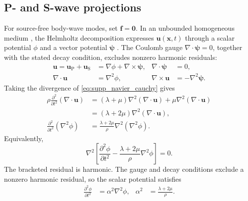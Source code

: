 \subsection*{P- and S-wave projections}

For source-free body-wave modes, set $\mathbf{f} = \mathbf{0}$. In an unbounded
homogeneous medium , the Helmholtz
decomposition expresses $\mathbf{u}(\mathbf{x},t)$ through a scalar potential
$\phi$ and a vector potential $\boldsymbol{\psi}$
\parencite{MorseFeshbach1953}.
The Coulomb gauge $\nabla \cdot \boldsymbol{\psi} = 0$, together with the
stated decay condition, excludes nonzero harmonic residuals:
\begin{equation*}
  \begin{aligned}
    \mathbf{u} = \mathbf{u}_\mathrm{P} + \mathbf{u}_\mathrm{S}
    & = \nabla\phi + \nabla \times \boldsymbol{\psi},
    &\nabla \cdot \boldsymbol{\psi}& = 0, \\
    \nabla \cdot \mathbf{u}& = \nabla^2\phi,
    &\nabla \times \mathbf{u}& = -\nabla^2\boldsymbol{\psi}.
  \end{aligned}
\end{equation*}
Taking the divergence of \cref{eq:supp_navier_cauchy} gives
\begin{equation*}
  \begin{aligned}
    \rho\frac{\partial^2}{\partial t^2}(\nabla \cdot \mathbf{u})
    & = (\lambda + \mu)\nabla^2(\nabla \cdot \mathbf{u})
    +\mu\nabla^2(\nabla \cdot \mathbf{u}) \\
    & = (\lambda + 2\mu)\nabla^2(\nabla \cdot \mathbf{u}), \\
    \frac{\partial^2}{\partial t^2}(\nabla^2\phi)
    & = \frac{\lambda + 2\mu}{\rho}\nabla^2(\nabla^2\phi).
  \end{aligned}
\end{equation*}
Equivalently,
\begin{equation*}
  \nabla^2\left[
    \frac{\partial^2\phi}{\partial t^2} -
    \frac{\lambda + 2\mu}{\rho}\nabla^2\phi
  \right] = 0.
\end{equation*}
The bracketed residual is harmonic. The gauge and decay conditions exclude a
nonzero harmonic residual, so the scalar potential satisfies
\begin{equation}
  \begin{aligned}
    \frac{\partial^2\phi}{\partial t^2} & = \alpha^2\nabla^2\phi,
    &\alpha^2& = \frac{\lambda + 2\mu}{\rho}.
  \end{aligned}
  \label{eq:supp_p_wave_equation}
\end{equation}

